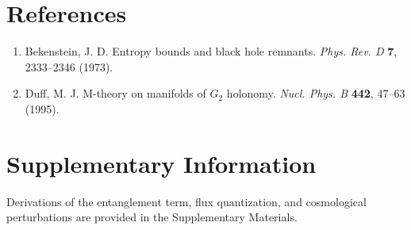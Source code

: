 \documentclass{nature}
\begin{document}
\section*{References}
\begin{enumerate}
\item Bekenstein, J. D. Entropy bounds and black hole remnants. \textit{Phys. Rev. D} \textbf{7}, 2333–2346 (1973).
\item Duff, M. J. M-theory on manifolds of $G_2$ holonomy. \textit{Nucl. Phys. B} \textbf{442}, 47–63 (1995).
\end{enumerate}

\section*{Supplementary Information}
Derivations of the entanglement term, flux quantization, and cosmological perturbations are provided in the Supplementary Materials.
\end{document}
